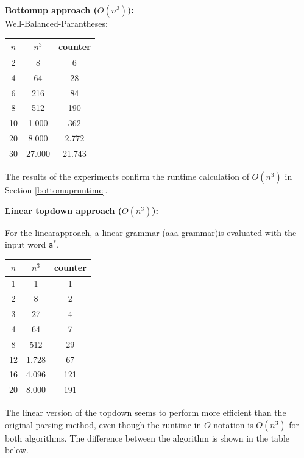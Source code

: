 \documentclass[a4paper, 11pt]{article}
\begin{document}
\textbf{Bottomup approach ($O(n^3)$):} \\

Well-Balanced-Parantheses: \\

\begin{center}

\begin{tabular}{|c|c|c|}
\hline
$n$ & $n^3$ & counter \\
\hline
2& 8 & 6\\
4& 64 & 28\\
6& 216 & 84\\
8& 512 & 190 \\
10& 1.000 & 362 \\
20& 8.000 & 2.772 \\
30& 27.000 & 21.743\\
\hline
\end{tabular}
\end{center}

    


The results of the experiments confirm the runtime calculation of $O(n^3)$ in Section \ref{bottomupruntime}.



\textbf{Linear topdown approach ($O(n^3)$):} 

For the linearapproach, a linear grammar (aaa-grammar)is evaluated with the input word \texttt{a$^*$}.

\begin{center}

\begin{tabular}{|c|c|c|}
\hline
$n$ & $n^3$ & counter \\
\hline
1& 1 & 1\\
2& 8 & 2\\
3& 27 & 4\\
4& 64 & 7\\
8& 512 & 29 \\
12& 1.728 & 67 \\
16& 4.096 & 121 \\
20& 8.000 & 191 \\
\hline
\end{tabular}
\end{center}

The linear version of the topdown seems to perform more efficient than the original parsing method, even though the runtime in $O$-notation is $O(n^3)$ for both algorithms. The difference between the algorithm is shown in the table below. 
\end{document}
